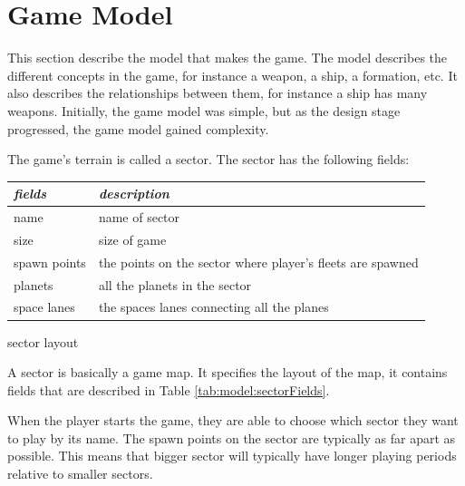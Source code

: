 \section{Game Model}

% 

This section describe the model that makes the game.
The model describes the different concepts in the game, for instance a weapon, a ship, a formation, etc.
It also describes the relationships between them, for instance a ship has many weapons.
Initially, the game model was simple, but as the design stage progressed, the game model gained complexity.

The game's terrain is called a sector. The sector has the following fields:
\begin{margintable}
    \begin{tabular}{p{3em} p{9em}}
    \toprule
    \emph{fields} & \emph{description} \\
    \midrule

    name & name of sector \\
    size & size of game \\
    spawn points & the points on the sector where player's fleets are spawned \\
    planets & all the planets in the sector \\
    space lanes & the spaces lanes connecting all the planes \\

    \bottomrule
    \end{tabular}
    	\vspace{1em}
	\caption{sector layout}
	\label{tab:model:sectorFields}
\end{margintable}

A sector is basically a game map.
It specifies the layout of the map, it contains fields that are described in Table \ref{tab:model:sectorFields}.

When the player starts the game, they are able to choose which sector they want to play by its name. 
The spawn points on the sector are typically as far apart as possible. 
This means that bigger sector will typically have longer playing periods relative to smaller sectors.

